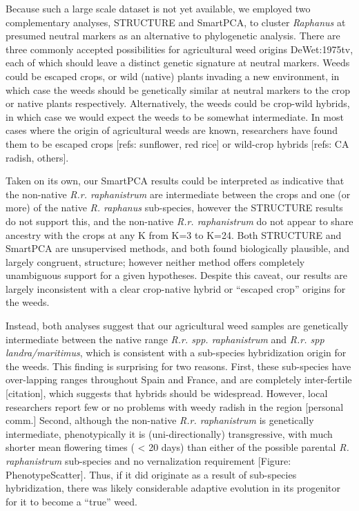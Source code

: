 \documentclass[twocolumn]{bmcart}%
\begin{document}
Because such a large scale dataset is not yet available, we employed two complementary analyses, STRUCTURE and SmartPCA, to cluster \textit{Raphanus} at presumed neutral markers as an alternative to phylogenetic analysis. There are three commonly accepted possibilities for agricultural weed origins {DeWet:1975tv}, each of which should leave a distinct genetic signature at neutral markers. Weeds could be escaped crops, or wild (native) plants invading a new environment, in which case the weeds should be genetically similar at neutral markers to the crop or native plants respectively. Alternatively, the weeds could be crop-wild hybrids, in which case we would expect the weeds to be somewhat intermediate. In most cases where the origin of agricultural weeds are known, researchers have found them to be escaped crops [refs: sunflower, red rice] or wild-crop hybrids [refs: CA radish, others].

Taken on its own, our SmartPCA results could be interpreted as indicative that the non-native \textit{R.r. raphanistrum} are intermediate between the crops and one (or more) of the native \textit{R. raphanus} sub-species, however the STRUCTURE results do not support this, and the non-native \textit{R.r. raphanistrum} do not appear to share ancestry with the crops at any K from K=3 to K=24. Both STRUCTURE and SmartPCA are unsupervised methods, and both found biologically plausible, and largely congruent, structure; however neither method offers completely unambiguous support for a given hypotheses. Despite this caveat, our results are largely inconsistent with a clear crop-native hybrid or “escaped crop” origins for the weeds.

Instead, both analyses suggest that our agricultural weed samples are genetically intermediate between the native range \textit{R.r. spp. raphanistrum} and \textit{R.r. spp landra/maritimus}, which is consistent with a sub-species hybridization origin for the weeds. This finding is surprising for two reasons. First, these sub-species have over-lapping ranges throughout Spain and France, and are completely inter-fertile [citation], which suggests that hybrids should be widespread. However, local researchers report few or no problems with weedy radish in the region [personal comm.] Second, although the non-native \textit{R.r. raphanistrum} is genetically intermediate, phenotypically it is (uni-directionally) transgressive, with much shorter mean flowering times ( < 20 days) than either of the possible parental \textit{R. raphanistrum} sub-species and no vernalization requirement [Figure: PhenotypeScatter]. Thus, if it did originate as a result of sub-species hybridization, there was likely considerable adaptive evolution in its progenitor for it to become a “true” weed.
\end{document}
